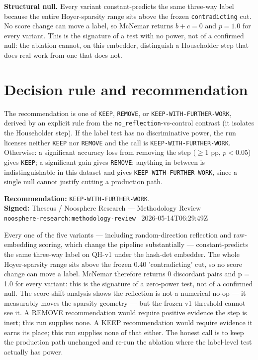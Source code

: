 \documentclass[11pt]{article}
\begin{document}
\noindent\textbf{Structural null.} Every variant constant-predicts the same three-way label because the entire Hoyer-sparsity range sits above the frozen \texttt{contradicting} cut. No score change can move a label, so McNemar returns $b + c = 0$ and $p = 1.0$ for every variant. This is the signature of a test with no power, not of a confirmed null: the ablation cannot, on this embedder, distinguish a Householder step that does real work from one that does not.

\section{Decision rule and recommendation}
The recommendation is one of \texttt{KEEP}, \texttt{REMOVE}, or \texttt{KEEP-WITH-FURTHER-WORK}, derived by an explicit rule from the \texttt{no\_reflection}-vs-control contrast (it isolates the Householder step). If the label test has no discriminative power, the run licenses neither \texttt{KEEP} nor \texttt{REMOVE} and the call is \texttt{KEEP-WITH-FURTHER-WORK}. Otherwise: a significant accuracy loss from removing the step ($\ge 1$ pp, $p < 0.05$) gives \texttt{KEEP}; a significant gain gives \texttt{REMOVE}; anything in between is indistinguishable in this dataset and gives \texttt{KEEP-WITH-FURTHER-WORK}, since a single null cannot justify cutting a production path.

\noindent\textbf{Recommendation:} \texttt{KEEP-WITH-FURTHER-WORK}.\\
\textbf{Signed:} Theseus / Noosphere Research — Methodology Review\\
\texttt{noosphere-research:methodology-review} \textperiodcentered\ 2026-05-14T06:29:49Z

Every one of the five variants --- including random-direction reflection and raw-embedding scoring, which change the pipeline substantially --- constant-predicts the same three-way label on QH-v1 under the hash-det embedder. The whole Hoyer-sparsity range sits above the frozen 0.40 'contradicting' cut, so no score change can move a label. McNemar therefore returns 0 discordant pairs and p = 1.0 for every variant: this is the signature of a zero-power test, not of a confirmed null. The score-shift analysis shows the reflection is not a numerical no-op --- it measurably moves the sparsity geometry --- but the frozen v1 threshold cannot see it. A REMOVE recommendation would require positive evidence the step is inert; this run supplies none. A KEEP recommendation would require evidence it earns its place; this run supplies none of that either. The honest call is to keep the production path unchanged and re-run the ablation where the label-level test actually has power.
\end{document}
